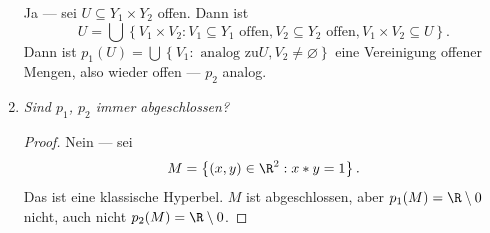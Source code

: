 \begin{solution}
\begin{enumerate}
    Ja --- sei \( U \subseteq Y_1 \times Y_2 \) offen. Dann ist
    \begin{equation*}
      U = \bigcup\left \{ V_1 \times V_2 : V_1 \subseteq Y_1 \text{ offen}, V_2 \subseteq Y_2 \text{ offen}, V_1 \times V_2 \subseteq U \right \} \text{.}
    \end{equation*}
    Dann ist \( p_1(U) = \bigcup\left \{ V_1 : \text{ analog zu} U, V_2 \neq \varnothing \right \} \) eine Vereinigung offener Mengen, also wieder offen --- \( p_2 \) analog.
    
    \item \emph{Sind \( p_1 \), \( p_2 \) immer abgeschlossen?}
    
    \begin{proof}
      Nein --- sei
      \begin{equation*}
        M = \left \{ (x,y) \in \R^2 : x*y = 1 \right \} \text{.}
      \end{equation*}
      Das ist eine klassische Hyperbel. \( M \) ist abgeschlossen, aber \( p_1(M) = \R \setminus { 0} \) nicht, auch nicht \( p_2(M) = \R \setminus { 0} \).
    \end{proof}
  \end{enumerate}
\end{solution}

